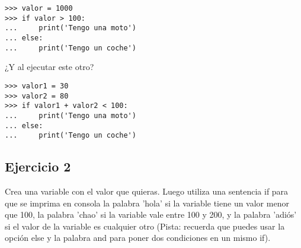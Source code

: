 \begin{listing}
\begin{verbatim}
>>> valor = 1000
>>> if valor > 100:
...     print('Tengo una moto')
... else:
...     print('Tengo un coche')
\end{verbatim}
\end{listing}

¿Y al ejecutar este otro?

\begin{listing}
\begin{verbatim}
>>> valor1 = 30
>>> valor2 = 80
>>> if valor1 + valor2 < 100:
...     print('Tengo una moto')
... else:
...     print('Tengo un coche')
\end{verbatim}
\end{listing}

\subsection*{Ejercicio 2}
Crea una variable con el valor que quieras. Luego utiliza una sentencia if para que se imprima en consola la palabra 'hola' si la variable tiene un valor menor que 100, la palabra 'chao' si la variable vale entre 100 y 200, y la palabra 'adiós' si el valor de la variable es cualquier otro (Pista: recuerda que puedes usar la opción else y la palabra and para poner dos condiciones en un mismo if).

\newpage
